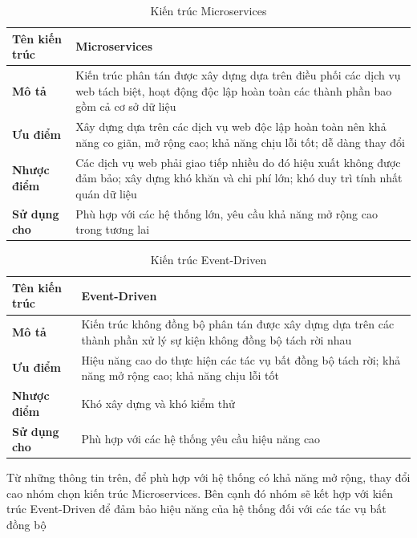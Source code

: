 \begin{table}[h]
    \begin{tabular}{|p{3cm}|p{12cm}|}
        \hline
        \textbf{Tên kiến trúc} & Microservices\\
        \hline
        \textbf{Mô tả}         & Kiến trúc phân tán được xây dựng dựa trên điều phối các dịch vụ web tách biệt, hoạt động độc lập hoàn toàn các thành phần bao gồm cả cơ sở dữ liệu    \\
        \hline
        \textbf{Ưu điểm}       & Xây dựng dựa trên các dịch vụ web độc lập hoàn toàn nên khả năng co giãn, mở rộng cao; khả năng chịu lỗi tốt; dễ dàng thay đổi\\
        \hline
        \textbf{Nhược điểm}    & Các dịch vụ web phải giao tiếp nhiều do đó hiệu xuất không được đảm bảo; xây dựng khó khăn và chi phí lớn; khó duy trì tính nhất quán dữ liệu \\
        \hline
        \textbf{Sử dụng cho}   & Phù hợp với các hệ thống lớn, yêu cầu khả năng mở rộng cao trong tương lai                  \\
        \hline
    \end{tabular}
    \caption{Kiến trúc Microservices}
\end{table}
 
\newpage
 
\begin{table}[h]
    \begin{tabular}{|p{3cm}|p{12cm}|}
        \hline
        \textbf{Tên kiến trúc} & Event-Driven\\
        \hline
        \textbf{Mô tả}         & Kiến trúc không đồng bộ phân tán được xây dựng dựa trên các thành phần xử lý sự kiện không đồng bộ tách rời nhau \\
        \hline
        \textbf{Ưu điểm}       & Hiệu năng cao do thực hiện các tác vụ bất đồng bộ tách rời; khả năng mở rộng cao; khả năng chịu lỗi tốt \\
        \hline
        \textbf{Nhược điểm}    & Khó xây dựng và khó kiểm thử \\
        \hline
        \textbf{Sử dụng cho}   & Phù hợp với các hệ thống yêu cầu hiệu năng cao \\
        \hline
    \end{tabular}
    \caption{Kiến trúc Event-Driven}
\end{table}
 
 
Từ những thông tin trên, để phù hợp với hệ thống có khả năng mở rộng, thay đổi cao nhóm chọn kiến trúc Microservices. Bên cạnh đó nhóm sẽ kết hợp với kiến trúc Event-Driven để đảm bảo hiệu năng của hệ thống đối với các tác vụ bất đồng bộ

